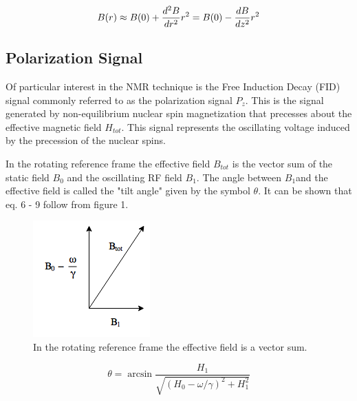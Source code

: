\documentclass[%
 reprint,
 amsmath,
 amssymb,
 aps,
]{revtex4-1}
\begin{document}
	\begin{equation}
	B(r)
	\approx
	B(0) + \frac{d^2B}{dr^2} r^2
	\\*
	= 
	B(0) - \frac{dB}{dz^2} r^2
	\end{equation}
	




\subsection{\label{sec:level2} Polarization Signal}


	
	
	
	
	
	
	
	Of particular interest in the NMR technique is the Free Induction Decay (FID) signal commonly referred to as the polarization signal $P_z$. This is the signal generated by non-equilibrium nuclear spin magnetization that precesses about the effective magnetic field $H_{tot}$. This signal represents the oscillating voltage induced by the precession of the nuclear spins. 
	
	In the rotating reference frame the effective field $B_{tot}$ is the vector sum of the static field $B_0$ and the oscillating RF field $B_1$. The angle between $B_1$and the effective field is called the "tilt angle" given by the symbol $\theta$. It can be shown that eq. 6 - 9 follow from figure 1. 
	
	\begin{figure}[H]
 	\includegraphics{pythag.png}
 	\caption{In the rotating reference frame the effective field is a vector sum.}
  	\label{fig:boat1}
	\end{figure} 
	
	\begin{equation}
	\theta = \arcsin \frac{H_1}{\sqrt{(H_0 - \omega/\gamma)^2 + H_1^2}}
	\end{equation}
\end{document}
